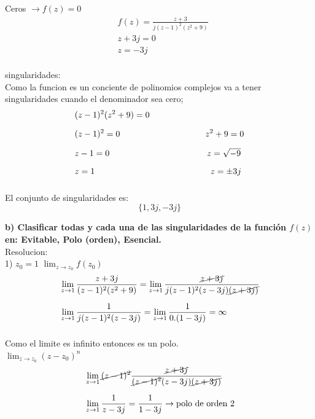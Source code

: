 \documentclass[12pt]{report}
\begin{document}
Ceros $\rightarrow f(z)=0$\\

\begin{align*}
&f(z)=\frac{z + 3}{j(z - 1)^2(z^2 + 9)}\\[6pt]
&z+3j=0\\[6pt]
&z=-3j\\[6pt]
\end{align*}
    
singularidades:\\

Como la funcion es un conciente de polinomios complejos va a tener singularidades cuando el denominador sea cero;\\

\begin{align*}
    &(z-1)^2(z^2+9)=0\\[6pt]
    &(z-1)^2=0 \hspace{3.5cm}    z^2+9=0\\[6pt]
    &z-1=0     \hspace{4cm}   z=\sqrt{-9}\\[6pt]
    &z=1       \hspace{4.75cm}  z=\pm3j\\[6pt]
\end{align*}

El conjunto de singularidades es: $$\{1,3j,-3j\}$$

\textbf{b) Clasificar todas y cada una de las singularidades de la función $f(z)$ en: Evitable, Polo (orden), Esencial.}\\[6pt]
Resolucion:\\

1) $z_0=1$ \hspace{3cm} $\lim_{z \to z_0}f(z_0)$\\[10pt]

\begin{align*}
&\lim_{z \to 1}\frac{z+3j}{(z - 1)^2(z^2 + 9)}=\lim_{z \to 1}\frac{\cancel{z+3j}}{j(z - 1)^2(z-3j)\cancel{(z+3j)}}\\[6pt]
&\lim_{z \to 1}\frac{1}{j(z - 1)^2(z-3j)}=\lim_{z \to 1}\frac{1}{0.(1-3j)}=\infty\\[6pt]
\end{align*}

Como el limite es infinito entonces es un polo.\\
$\lim_{z \to z_0}(z-z_0)^n$\\[10pt]

\begin{align*}
&\lim_{z \to 1}\cancel{(z - 1)^2}\frac{\cancel{z+3j}}{\cancel{(z - 1)^2}(z-3j)\cancel{(z+3j)}}\\[6pt]
&\lim_{z \to 1}\frac{1}{z-3j}=\frac{1}{1-3j}\rightarrow \text{polo de orden 2}\\[12pt]
\end{align*}
\end{document}
